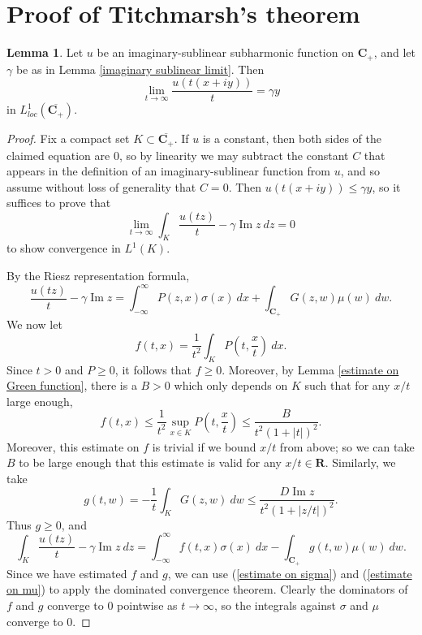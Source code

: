 \documentclass[12pt]{report}
\newcommand{\RR}{\mathbf{R}}
\newcommand{\CC}{\mathbf{C}}
\renewcommand{\Im}{\operatorname{Im}}
\theoremstyle{definition}
\newtheorem{lemma}[theorem]{Lemma}
\begin{document}
\section{Proof of Titchmarsh's theorem}
\begin{lemma}
    \label{gamma in mean}
    Let $u$ be an imaginary-sublinear subharmonic function on $\CC_+$, and let $\gamma$ be as in Lemma \ref{imaginary sublinear limit}. Then
$$\lim_{t \to \infty} \frac{u(t(x + iy))}{t} = \gamma y$$
    in $L^1_{loc}(\overline{\CC_+})$.
\end{lemma}
\begin{proof}
    Fix a compact set $K \subset \overline{\CC_+}$. If $u$ is a constant, then both sides of the claimed equation are $0$, so by linearity we may subtract the constant $C$ that appears in the definition of an imaginary-sublinear function from $u$, and so assume without loss of generality that $C = 0$. Then $u(t(x+iy)) \leq \gamma y$, so it suffices to prove that
$$\lim_{t \to \infty} \int_K \frac{u(tz)}{t} - \gamma \Im z ~dz = 0$$
    to show convergence in $L^1(K)$.

    By the Riesz representation formula,
$$\frac{u(tz)}{t} - \gamma \Im z = \int_{-\infty}^\infty P(z, x) \sigma(x) ~dx + \int_{\CC_+} G(z, w) \mu(w) ~dw.$$
    We now let
    $$f(t, x) = \frac{1}{t^2} \int_K P\left(t, \frac{x}{t}\right) ~dx.$$
    Since $t > 0$ and $P \geq 0$, it follows that $f \geq 0$. Moreover, by Lemma \ref{estimate on Green function}, there is a $B > 0$ which only depends on $K$ such that for any $x/t$ large enough,
    $$f(t, x) \leq \frac{1}{t^2} \sup_{x \in K} P\left(t, \frac{x}{t}\right) \leq \frac{B}{t^2(1 + |t|)^2}.$$
    Moreover, this estimate on $f$ is trivial if we bound $x/t$ from above; so we can take $B$ to be large enough that this estimate is valid for any $x/t \in \RR$. Similarly, we take
    $$g(t, w) = -\frac{1}{t} \int_K G(z, w) ~dw \leq \frac{D \Im z}{t^2(1+|z/t|)^2}.$$
    Thus $g \geq 0$, and
    $$\int_K \frac{u(tz)}{t} - \gamma \Im z ~dz = \int_{-\infty}^\infty f(t, x) \sigma(x) ~dx - \int_{\CC_+} g(t, w) \mu(w) ~dw.$$
    Since we have estimated $f$ and $g$, we can use (\ref{estimate on sigma}) and (\ref{estimate on mu}) to apply the dominated convergence theorem. Clearly the dominators of $f$ and $g$ converge to $0$ pointwise as $t \to \infty$, so the integrals against $\sigma$ and $\mu$ converge to $0$.
\end{proof}
\end{document}
